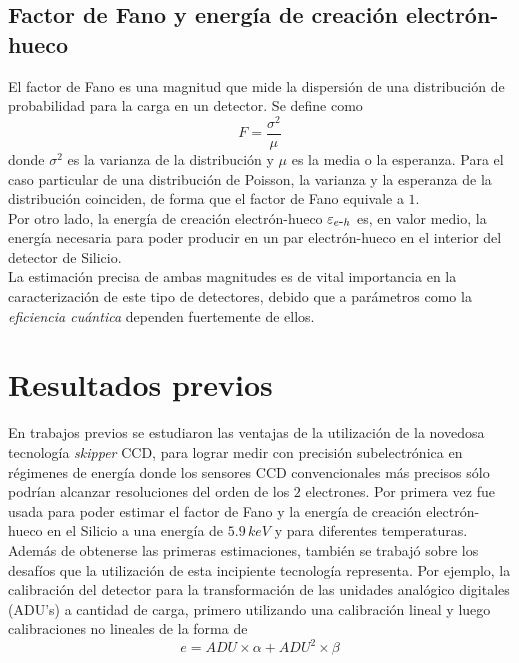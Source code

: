 \section{Factor de Fano y energía de creación electrón-hueco}
\noindent El factor de Fano es una magnitud que mide la dispersión de una distribución de probabilidad para la carga en un detector. Se define como
\begin{equation*}
    F = \frac{\sigma^{2}}{\mu}
\end{equation*}
donde $\sigma^{2}$ es la varianza de la distribución y $\mu$ es la media o la esperanza. Para el caso particular de una distribución de Poisson, la varianza y la esperanza de la distribución coinciden, de forma que el factor de Fano equivale a $1$.\\
\indent Por otro lado, la energía de creación electrón-hueco $\varepsilon_{e\mbox{-}h}$ es, en valor medio, la energía necesaria para poder producir en un par electrón-hueco en el interior del detector de Silicio.\\
\indent La estimación precisa de ambas magnitudes es de vital importancia en la caracterización de este tipo de detectores, debido que a parámetros como la \textit{eficiencia cuántica} dependen fuertemente de ellos.

\chapter{Resultados previos}
\noindent En trabajos previos se estudiaron las ventajas de la utilización de la novedosa tecnología \textit{skipper} CCD, para lograr medir con precisión subelectrónica en régimenes de energía donde los sensores CCD convencionales más precisos sólo podrían alcanzar resoluciones del orden de los $2$ electrones. Por primera vez fue usada para poder estimar el factor de Fano y la energía de creación electrón-hueco en el Silicio a una energía de $5.9\,\si{keV}$ y para diferentes temperaturas. Además de obtenerse las primeras estimaciones, también se trabajó sobre los desafíos que la utilización de esta incipiente tecnología representa. Por ejemplo, la calibración del detector para la transformación de las unidades analógico digitales (ADU's) a cantidad de carga, primero utilizando una calibración lineal y luego calibraciones no lineales de la forma de
\begin{equation*}
    e = ADU \times \alpha + ADU^{2} \times \beta
\end{equation*}

